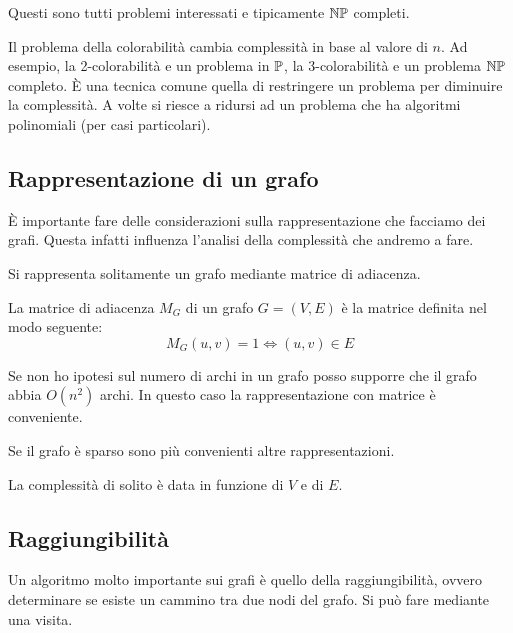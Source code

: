 Questi sono tutti problemi interessati e tipicamente $\mathbb{NP}$ completi.

Il problema della colorabilità cambia complessità in base al valore di $n$. Ad esempio, la
2-colorabilità e un problema in $\mathbb{P}$, la 3-colorabilità e un problema $\mathbb{NP}$ completo. È
una tecnica comune quella di restringere un problema per diminuire la complessità. A volte si
riesce a ridursi ad un problema che ha algoritmi polinomiali (per casi particolari).


\subsection{Rappresentazione di un grafo}

È importante fare delle considerazioni sulla rappresentazione che facciamo dei grafi. Questa
infatti influenza l'analisi della complessità che andremo a fare.

Si rappresenta solitamente un grafo mediante matrice di adiacenza.

\begin{defn}
    La matrice di adiacenza $M_{G}$ di un grafo $G = (V,E)$ è la matrice definita nel modo
    seguente:
    \begin{equation*}
        M_{G}(u,v) = 1 \iff (u,v) \in E
    \end{equation*}
\end{defn}

Se non ho ipotesi sul numero di archi in un grafo posso supporre che il grafo abbia $O(n^{2})$ archi.
In questo caso la rappresentazione con matrice è conveniente.

Se il grafo è sparso sono più convenienti altre rappresentazioni.

La complessità di solito è data in funzione di $V$ e di $E$.

\subsection{Raggiungibilità}

Un algoritmo molto importante sui grafi è quello della raggiungibilità, ovvero determinare se
esiste un cammino tra due nodi del grafo. Si può fare mediante una visita.

